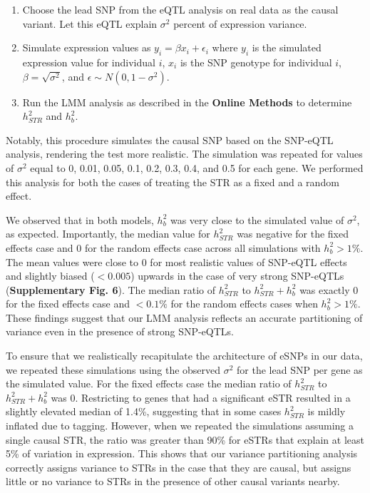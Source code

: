 \begin{enumerate}
\item Choose the lead SNP from the eQTL analysis on real data as the causal variant. Let this eQTL explain $\sigma^2$ percent of expression variance.
\item Simulate expression values as $y_i=\beta x_i+\epsilon_i$ where $y_i$ is the simulated expression value for individual $i$, $x_i$ is the SNP genotype for individual $i$, $\beta = \sqrt{\sigma^2}$, and $\epsilon \sim N(0, 1-\sigma^2)$.
\item Run the LMM analysis as described in the \textbf{Online Methods} to determine $h^2_{STR}$ and $h^2_{b}$.
\end{enumerate}

Notably, this procedure simulates the causal SNP based on the SNP-eQTL analysis, rendering the test more realistic.
The simulation was repeated for values of $\sigma^2$ equal to 0, 0.01, 0.05, 0.1, 0.2, 0.3, 0.4, and 0.5 for each gene. We performed this analysis for both the cases of treating the STR as a fixed and a random effect.

We observed that in both models, $h^2_{b}$ was very close to the simulated value of $\sigma^2$, as expected. Importantly, the median value for $h^2_{STR}$ was negative for the fixed effects case and 0 for the random effects case across all simulations with $h^2_b>1\%$. The mean values were close to 0 for most realistic values of SNP-eQTL effects and slightly biased ($<0.005$) upwards in the case of very strong SNP-eQTLs (\textbf{Supplementary Fig. 6}). The median ratio of $h^2_{STR}$ to $h^2_{STR}+h^2_{b}$ was exactly 0 for the fixed effects case and $<0.1\%$ for the random effects cases when $h^2_b>1\%$. These findings suggest that our LMM analysis reflects an accurate partitioning of variance even in the presence of strong SNP-eQTLs.

To ensure that we realistically recapitulate the architecture of eSNPs in our data, we repeated these simulations using the observed $\sigma^2$ for the lead SNP per gene as the simulated value. For the fixed effects case the median ratio of $h^2_{STR}$ to $h^2_{STR}+h^2_{b}$ was 0. Restricting to genes that had a significant eSTR resulted in a slightly elevated median of 1.4\%, suggesting that in some cases $h^2_{STR}$ is mildly inflated due to tagging. However, when we repeated the simulations assuming a single causal STR, the ratio was greater than 90\% for eSTRs that explain at least 5\% of variation in expression. This shows that our variance partitioning analysis correctly assigns variance to STRs in the case that they are causal, but assigns little or no variance to STRs in the presence of other causal variants nearby.

